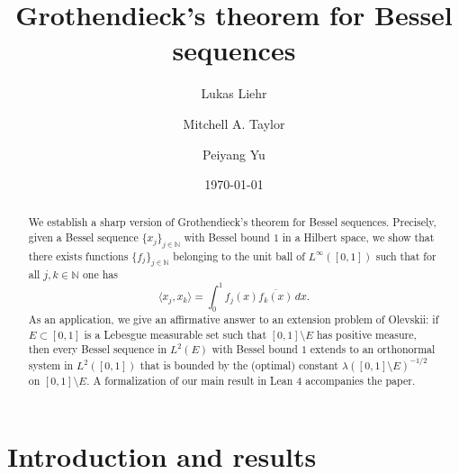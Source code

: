 \documentclass[reqno,a4paper,12pt]{amsart}
\numberwithin{equation}{section}
\newcommand\1{\mathds{1}}
\begin{document}
\title[Grothendieck's theorem for Bessel sequences]{Grothendieck's theorem for Bessel sequences}

\author[Lukas Liehr]{Lukas Liehr}
\address{Department of Mathematics, Bar-Ilan University, Ramat-Gan 5290002, Israel}

\author[Mitchell A. Taylor]{Mitchell A. Taylor}
\address{ Department of Mathematics, ETH Z\"urich, R\"amistrasse 101, 8092 Z\"urich, Switzerland}

\author[Peiyang Yu]{Peiyang Yu}
\address{Department of Mathematics, ETH Z\"urich, R\"amistrasse 101, 8092 Z\"urich, Switzerland}

\date{\today}

\begin{abstract}
We establish a sharp version of Grothendieck's theorem for Bessel sequences. Precisely, given a Bessel sequence $\{ x_j \}_{j\in\mathbb{N}}$ with Bessel bound $1$ in a Hilbert space, we show that there exists functions $\{ f_j \}_{j\in\mathbb{N}}$ belonging to the unit ball of $L^\infty([0,1])$
such that for all $j,k \in \mathbb{N}$ one has
$$
\langle x_j,x_k\rangle
=
\int_0^1 f_j(x)\overline{f_k(x)}\,dx.
$$
As an application, we give an affirmative answer to an extension problem of Olevskii: if $E \subset [0,1]$ is a Lebesgue measurable set such that $[0,1]\setminus E$ has positive measure, then every Bessel sequence in $L^2(E)$ with Bessel bound $1$ extends to an orthonormal system in $L^2([0,1])$ that is bounded by the (optimal) constant $\lambda([0,1]\setminus E)^{-1/2}$ on $[0,1]\setminus E$. A formalization of our main result in Lean 4 accompanies the paper.
\end{abstract}

\maketitle

\section{Introduction and results}
\end{document}
